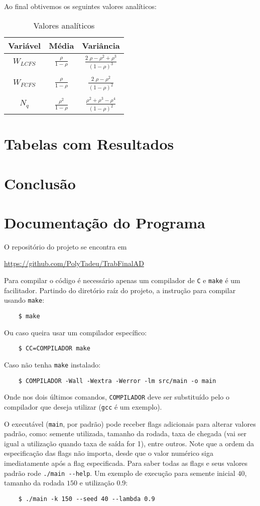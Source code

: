 \documentclass[a4paper]{article}
\newcommand{\inlcode}{\texttt}
\newcommand{\lang}{\texttt}
\begin{document}
Ao final obtivemos os seguintes valores analíticos:
\begin{table}[h]
\centering
    \begin{tabular}{|c|cc|}\hline
        Variável & Média & Variância \\\hline
        $ W_{LCFS} $&$ \frac{\rho}{1-\rho} $&$
            \frac{2 \; \rho - \rho^2 + \rho^3}{(1-\rho)^3} $\\&&\\
        $ W_{FCFS} $&$ \frac{\rho}{1-\rho} $&$
            \frac{2 \; \rho - \rho^2}{(1 - \rho)^2} $\\&&\\
        $ N_q      $&$ \frac{\rho^2}{1 - \rho} $&$
            \frac{\rho^2 + \rho^3 - \rho^4}{(1 - \rho)^2} $\\\hline
    \end{tabular}
\caption{Valores analíticos}
\end{table}

\newpage
\section{Tabelas com Resultados}
\section{Conclusão}
\newpage
\section{Documentação do Programa}
O repositório do projeto se encontra em \par
\url{https://github.com/PolyTadeu/TrabFinalAD}

Para compilar o código é necessário apenas
um compilador de \lang{C}
e \inlcode{make} é um facilitador.
Partindo do diretório raíz do projeto,
a instrução para compilar usando \inlcode{make}:
\begin{verbatim}
    $ make
\end{verbatim}
Ou caso queira usar um compilador específico:
\begin{verbatim}
    $ CC=COMPILADOR make
\end{verbatim}
Caso não tenha \inlcode{make} instalado:
\begin{verbatim}
    $ COMPILADOR -Wall -Wextra -Werror -lm src/main -o main
\end{verbatim}
Onde nos dois últimos comandos,
\verb.COMPILADOR. deve ser substituído
pelo o compilador que deseja utilizar
(\inlcode{gcc} é um exemplo).

O executável (\inlcode{main}, por padrão)
pode receber flags adicionais para alterar valores padrão,
como: semente utilizada, tamanho da rodada,
taxa de chegada
(vai ser igual a utilização quando taxa de saída for 1),
entre outros.
Note que a ordem da especificação das flags não importa,
desde que o valor numérico siga imediatamente após
a flag especificada.
Para saber todas as flags e seus valores padrão
rode \inlcode{./main -{}-help}.
Um exemplo de execução para semente inicial \(40\),
tamanho da rodada \(150\) e utilização \(0.9\):
\begin{verbatim}
    $ ./main -k 150 --seed 40 --lambda 0.9
\end{verbatim}
\end{document}

